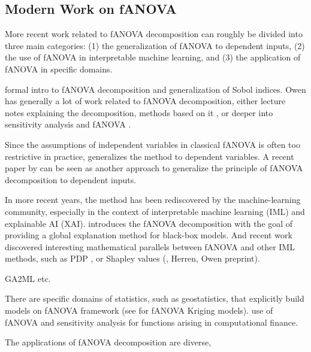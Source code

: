 \subsection{Modern Work on fANOVA}
More recent work related to fANOVA decomposition can roughly be divided into three main categories: (1) the generalization of fANOVA to dependent inputs, (2) the use of fANOVA in interpretable machine learning, and (3) the application of fANOVA in specific domains.

\cite{owen2013} formal intro to fANOVA decomposition and generalization of Sobol indices.
Owen has generally a lot of work related to fANOVA decomposition, either lecture notes explaining the decomposition, methods based on it \cite{owen2003}, or deeper into sensitivity analysis and fANOVA \cite{owen2013}.

Since the assumptions of independent variables in classical fANOVA is often too restrictive in practice, \cite{hooker2007} generalizes the method to dependent variables. A recent paper by \cite{ilidrissi2025} can be seen as another approach to generalize the principle of fANOVA decomposition to dependent inputs.\par

In more recent years, the method has been rediscovered by the machine-learning community, especially in the context of interpretable machine learning (IML) and explainable AI (XAI). \cite{hooker2004} introduces the fANOVA decomposition with the goal of providing a global explanation method for black-box models.
And recent work discovered interesting mathematical parallels between fANOVA and other IML methods, such as PDP \cite{friedman2001}, or Shapley values (\cite{fumagalli2025}, Herren, Owen preprint).

GA2ML etc.

There are specific domains of statistics, such as geostatistics, that explicitly build models on fANOVA framework (see \cite{muehlenstaedt2012} for fANOVA Kriging models).
\cite{liu2006} use of fANOVA and sensitivity analysis for functions arising in computational finance.

The applications of fANOVA decomposition are diverse, 

